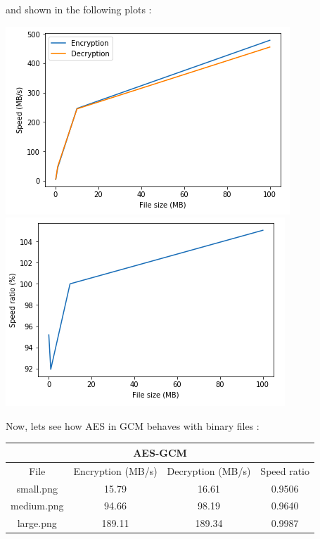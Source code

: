 \documentclass[11pt]{article}
\begin{document}
and shown in the following plots :
\begin{center}
\includegraphics[scale=0.4]{./aes_gcm_speed_comparison.png}
\includegraphics[scale=0.4]{./aes_gcm_speed_ratio.png}
\end{center}
Now, lets see how AES in GCM behaves with binary files :
\begin{center}
\begin{tabular}{| c | c | c | c |}
\hline
\multicolumn{4}{|c|}{AES-GCM} \\
\hline
File & Encryption (MB/s) & Decryption (MB/s) & Speed ratio\\
\hline
small.png & 15.79 & 16.61 & 0.9506 \\
\hline
medium.png & 94.66 & 98.19 & 0.9640 \\
\hline
large.png & 189.11 & 189.34  & 0.9987 \\
\hline
\end{tabular}
\end{center}
\end{document}
